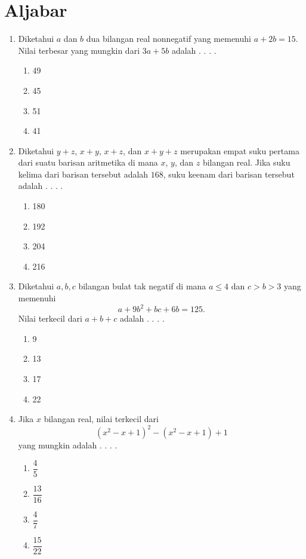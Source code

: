 \documentclass[12pt]{scrartcl}
\begin{document}
\section*{Aljabar}
\begin{enumerate}[label={Soal \arabic*}]
    \item Diketahui $a$ dan $b$ dua bilangan real nonnegatif yang memenuhi $a+2b=15$. Nilai terbesar yang mungkin dari $3a+5b$ adalah . . . .
    \begin{enumerate}[label={(\Alph*)}]
        \item 49 \item 45 \item 51 \item 41
    \end{enumerate}


    \item Diketahui $y+z$, $x+y$, $x+z$, dan $x+y+z$ merupakan empat suku pertama dari suatu barisan aritmetika di mana $x$, $y$, dan $z$ bilangan real. Jika suku kelima dari barisan tersebut adalah $168$, suku keenam dari barisan tersebut adalah . . . .
    \begin{enumerate}[label={(\Alph*)}]
        \item 180 \item 192 \item 204 \item 216
    \end{enumerate}

    \item Diketahui $a,b,c$ bilangan bulat tak negatif di mana $a\le 4$ dan $c>b>3$ yang memenuhi
    $$a+9b^2  + bc+6b= 125.$$
    Nilai terkecil dari $a+b+c$ adalah . . . .
    \begin{enumerate}[label={(\Alph*)}]
        \item 9 \item 13 \item 17 \item 22
    \end{enumerate}

    \item Jika $x$ bilangan real, nilai terkecil dari
    $$\left (x^2-x+1\right )^2 -\left (x^2-x+1\right )+1$$
    yang mungkin adalah . . . .
    \begin{enumerate}[label={(\Alph*)}]
        \item $\dfrac{4}{5}$ \item $\dfrac{13}{16}$ \item $\dfrac{4}{7}$ \item $\dfrac{15}{22}$
    \end{enumerate}


\end{enumerate}
\end{document}
